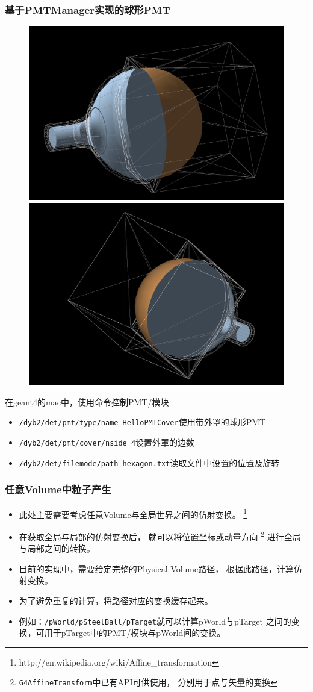 \begin{frame}
    \frametitle{基于PMTManager实现的球形PMT}
    \begin{figure}
        \centering
        \includegraphics[width=.5\textwidth,keepaspectratio]{data/newpmt-6-sides.png}
        \includegraphics[width=.5\textwidth,keepaspectratio]{data/newpmt-4-sides.png}
    \end{figure}
    在geant4的mac中，使用命令控制PMT/模块
    \begin{itemize}
        \item {\tt /dyb2/det/pmt/type/name HelloPMTCover}使用带外罩的球形PMT
        \item {\tt /dyb2/det/pmt/cover/nside 4}设置外罩的边数
        \item {\tt /dyb2/det/filemode/path
            hexagon.txt}读取文件中设置的位置及旋转
    \end{itemize}
\end{frame}

\begin{frame}
    \frametitle{任意Volume中粒子产生}
    \begin{itemize}
        \item 此处主要需要考虑任意Volume与全局世界之间的仿射变换。
                \footnote{http://en.wikipedia.org/wiki/Affine\_transformation}
        \item 在获取全局与局部的仿射变换后，
              就可以将位置坐标或动量方向
              \footnote{{\tt G4AffineTransform}中已有API可供使用，
                        分别用于点与矢量的变换}
              进行全局与局部之间的转换。
        \item 目前的实现中，需要给定完整的Physical Volume路径，
              根据此路径，计算仿射变换。
        \item 为了避免重复的计算，将路径对应的变换缓存起来。
        \item 例如：{\tt /pWorld/pSteelBall/pTarget}就可以计算pWorld与pTarget
              之间的变换，可用于pTarget中的PMT/模块与pWorld间的变换。
    \end{itemize}
\end{frame}

